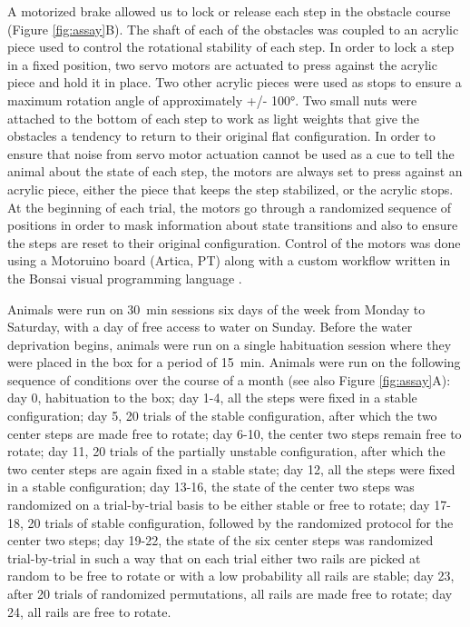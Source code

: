 A motorized brake allowed us to lock or release each step in the obstacle course (Figure \ref{fig:assay}B). The shaft of each of the obstacles was coupled to an acrylic piece used to control the rotational stability of each step. In order to lock a step in a fixed position, two servo motors are actuated to press against the acrylic piece and hold it in place. Two other acrylic pieces were used as stops to ensure a maximum rotation angle of approximately +/- \ang{100}. Two small nuts were attached to the bottom of each step to work as light weights that give the obstacles a tendency to return to their original flat configuration. In order to ensure that noise from servo motor actuation cannot be used as a cue to tell the animal about the state of each step, the motors are always set to press against an acrylic piece, either the piece that keeps the step stabilized, or the acrylic stops. At the beginning of each trial, the motors go through a randomized sequence of positions in order to mask information about state transitions and also to ensure the steps are reset to their original configuration. Control of the motors was done using a Motoruino board (Artica, PT) along with a custom workflow written in the Bonsai visual programming language \cite{Lopes2015a}.

Animals were run on \SI{30}{\minute} sessions six days of the week from Monday to Saturday, with a day of free access to water on Sunday. Before the water deprivation begins, animals were run on a single habituation session where they were placed in the box for a period of \SI{15}{\minute}. Animals were run on the following sequence of conditions over the course of a month (see also Figure \ref{fig:assay}A): day 0, habituation to the box; day 1-4, all the steps were fixed in a stable configuration; day 5, 20 trials of the stable configuration, after which the two center steps are made free to rotate; day 6-10, the center two steps remain free to rotate; day 11, 20 trials of the partially unstable configuration, after which the two center steps are again fixed in a stable state; day 12, all the steps were fixed in a stable configuration; day 13-16, the state of the center two steps was randomized on a trial-by-trial basis to be either stable or free to rotate; day 17-18, 20 trials of stable configuration, followed by the randomized protocol for the center two steps; day 19-22, the state of the six center steps was randomized trial-by-trial in such a way that on each trial either two rails are picked at random to be free to rotate or with a low probability all rails are stable; day 23, after 20 trials of randomized permutations, all rails are made free to rotate; day 24, all rails are free to rotate.

